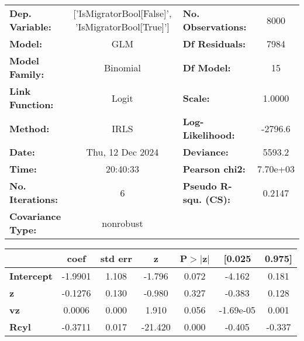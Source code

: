 \begin{center}
\begin{tabular}{lclc}
\toprule
\textbf{Dep. Variable:}   & ['IsMigratorBool[False]', 'IsMigratorBool[True]'] & \textbf{  No. Observations:  } &     8000    \\
\textbf{Model:}           &                        GLM                        & \textbf{  Df Residuals:      } &     7984    \\
\textbf{Model Family:}    &                      Binomial                     & \textbf{  Df Model:          } &       15    \\
\textbf{Link Function:}   &                       Logit                       & \textbf{  Scale:             } &    1.0000   \\
\textbf{Method:}          &                        IRLS                       & \textbf{  Log-Likelihood:    } &   -2796.6   \\
\textbf{Date:}            &                  Thu, 12 Dec 2024                 & \textbf{  Deviance:          } &    5593.2   \\
\textbf{Time:}            &                      20:40:33                     & \textbf{  Pearson chi2:      } &  7.70e+03   \\
\textbf{No. Iterations:}  &                         6                         & \textbf{  Pseudo R-squ. (CS):} &   0.2147    \\
\textbf{Covariance Type:} &                     nonrobust                     & \textbf{                     } &             \\
\bottomrule
\end{tabular}
\begin{tabular}{lcccccc}
                   & \textbf{coef} & \textbf{std err} & \textbf{z} & \textbf{P$> |$z$|$} & \textbf{[0.025} & \textbf{0.975]}  \\
\midrule
\textbf{Intercept} &      -1.9901  &        1.108     &    -1.796  &         0.072        &       -4.162    &        0.181     \\
\textbf{z}         &      -0.1276  &        0.130     &    -0.980  &         0.327        &       -0.383    &        0.128     \\
\textbf{vz}        &       0.0006  &        0.000     &     1.910  &         0.056        &    -1.69e-05    &        0.001     \\
\textbf{Rcyl}      &      -0.3711  &        0.017     &   -21.420  &         0.000        &       -0.405    &       -0.337     \\

\end{tabular}
\end{center}
